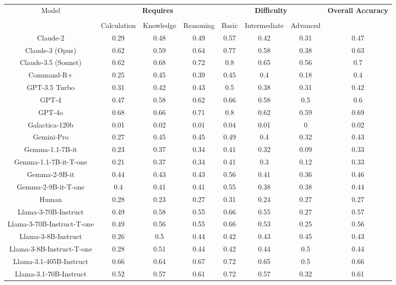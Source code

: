 \begin{tabular}{cccccccc}
\toprule
\multirow{3}{*}{Model} & \multicolumn{3}{c}{\textbf{Requires}} & \multicolumn{3}{c}{\textbf{Difficulty}} & \multirow{3}{*}{\textbf{Overall Accuracy}}\\\cmidrule(lr){2-4} \cmidrule(lr){5-7}\\
 & Calculation & Knowledge & Reasoning & Basic & Intermediate & Advanced &  \\
\midrule
Claude-2 & 0.29 & 0.48 & 0.49 & 0.57 & 0.42 & 0.31 & 0.47 \\
Claude-3 (Opus) & 0.62 & 0.59 & 0.64 & 0.77 & 0.58 & 0.38 & 0.63 \\
Claude-3.5 (Sonnet) & 0.62 & 0.68 & 0.72 & 0.8 & 0.65 & 0.56 & 0.7 \\
Command-R+ & 0.25 & 0.45 & 0.39 & 0.45 & 0.4 & 0.18 & 0.4 \\
GPT-3.5 Turbo & 0.31 & 0.42 & 0.43 & 0.5 & 0.38 & 0.31 & 0.42 \\
GPT-4 & 0.47 & 0.58 & 0.62 & 0.66 & 0.58 & 0.5 & 0.6 \\
GPT-4o & 0.68 & 0.66 & 0.71 & 0.8 & 0.62 & 0.59 & 0.69 \\
Galactica-120b & 0.01 & 0.02 & 0.01 & 0.04 & 0.01 & 0 & 0.02 \\
Gemini-Pro & 0.27 & 0.45 & 0.45 & 0.49 & 0.4 & 0.32 & 0.43 \\
Gemma-1.1-7B-it & 0.23 & 0.37 & 0.34 & 0.41 & 0.32 & 0.09 & 0.33 \\
Gemma-1.1-7B-it-T-one & 0.21 & 0.37 & 0.34 & 0.41 & 0.3 & 0.12 & 0.33 \\
Gemma-2-9B-it & 0.44 & 0.43 & 0.43 & 0.56 & 0.41 & 0.36 & 0.46 \\
Gemma-2-9B-it-T-one & 0.4 & 0.41 & 0.41 & 0.55 & 0.38 & 0.38 & 0.44 \\
Human & 0.28 & 0.23 & 0.27 & 0.31 & 0.24 & 0.27 & 0.27 \\
Llama-3-70B-Instruct & 0.49 & 0.58 & 0.55 & 0.66 & 0.55 & 0.27 & 0.57 \\
Llama-3-70B-Instruct-T-one & 0.49 & 0.56 & 0.55 & 0.66 & 0.53 & 0.25 & 0.56 \\
Llama-3-8B-Instruct & 0.26 & 0.5 & 0.44 & 0.42 & 0.43 & 0.45 & 0.43 \\
Llama-3-8B-Instruct-T-one & 0.28 & 0.51 & 0.44 & 0.42 & 0.44 & 0.5 & 0.44 \\
Llama-3.1-405B-Instruct & 0.66 & 0.64 & 0.67 & 0.72 & 0.65 & 0.5 & 0.66 \\
Llama-3.1-70B-Instruct & 0.52 & 0.57 & 0.61 & 0.72 & 0.57 & 0.32 & 0.61 \\

\end{tabular}

